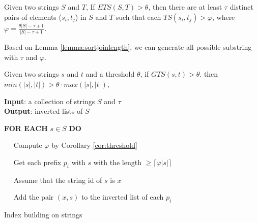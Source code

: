 \smallskip


\begin{corollary}  Given two strings $S$ and $T$, If $ETS(S,T) > \theta$, then there are at least $\tau$ distinct pairs of elements ($s_i, t_j$) in  $S$ and $T$ such that each $TS(s_i, t_j) > \varphi$, where $\varphi = \frac{\theta |S| - \tau +1}{|S|-\tau+1} $. \label{cor:threshold}
\end{corollary}

\smallskip

Based on Lemma \ref{lemma:sortjoinlength}, we can generate all possible substring with $\tau$ and  $\varphi$.

\begin{lem}  Given two strings $s$ and $t$ and a threshold $\theta$, if $GTS(s,t) > \theta$. then $min(|s|,|t|) > \theta \cdot max(|s|,|t|)$,

\end{lem}

\smallskip

\begin{algorithm}
	{\bf Input}: a collection of strings $S$ and $\tau$ \\
	{\bf Output}: inverted lists of $S$
	\begin{compactenum}[(1)]
		\item {\bf FOR EACH} $s \in S$ {\bf DO}
		\item ~~ Compute $\varphi$ by Corollary \ref{cor:threshold}
		\item ~~ Get each prefix $p_i$ with $s$ with the length $ \geq \lceil \varphi |s| \rceil$
		\item ~~ Assume that the string id of $s$ is $x$
		\item ~~  Add the pair  $(x,s)$  to the inverted list of each $p_i$
	\end{compactenum}
	\caption{Index building on strings}
	\label{alg:indexBuilding}
\end{algorithm}







\smallskip

